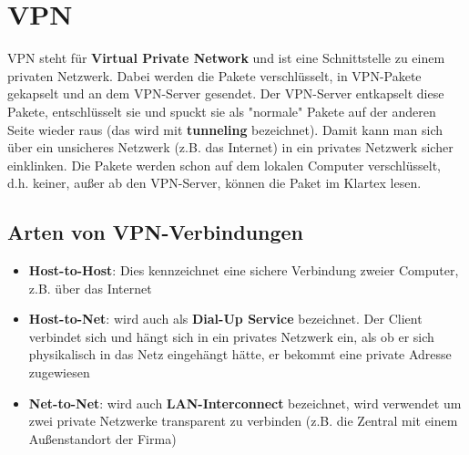 \chapter{VPN}

VPN steht für \textbf{Virtual Private Network} und ist eine Schnittstelle zu einem privaten Netzwerk. Dabei werden die Pakete verschlüsselt, in VPN-Pakete gekapselt und an dem VPN-Server gesendet. Der VPN-Server entkapselt diese Pakete, entschlüsselt sie und spuckt sie als "normale" Pakete auf der anderen Seite wieder raus (das wird mit \textbf{tunneling} bezeichnet). Damit kann man sich über ein unsicheres Netzwerk (z.B. das Internet) in ein privates Netzwerk sicher einklinken. Die Pakete werden schon auf dem lokalen Computer verschlüsselt, d.h. keiner, außer ab den VPN-Server, können die Paket im Klartex lesen.

\section{Arten von VPN-Verbindungen}

\begin{itemize}
\item \textbf{Host-to-Host}: Dies kennzeichnet eine sichere Verbindung zweier Computer, z.B. über das Internet
\item \textbf{Host-to-Net}: wird auch als \textbf{Dial-Up Service} bezeichnet. Der Client verbindet sich und hängt sich in ein privates Netzwerk ein, als ob er sich physikalisch in das Netz eingehängt hätte, er bekommt eine private Adresse zugewiesen
\item \textbf{Net-to-Net}: wird auch \textbf{LAN-Interconnect} bezeichnet, wird verwendet um zwei private Netzwerke transparent zu verbinden (z.B. die Zentral mit einem Außenstandort der Firma)
\end{itemize}